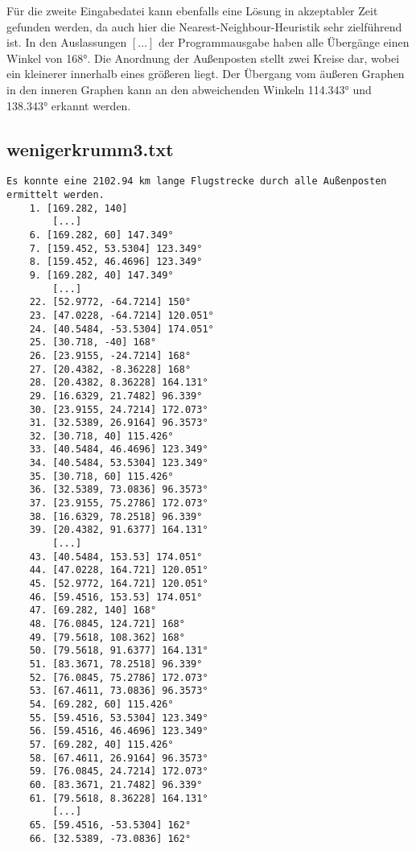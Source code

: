 \documentclass[a4paper,10pt,ngerman]{scrartcl}
\begin{document}
    Für die zweite Eingabedatei kann ebenfalls eine Lösung in akzeptabler Zeit gefunden werden,
    da auch hier die Nearest-Neighbour-Heuristik sehr zielführend ist.
    In den Auslassungen $[\dots]$ der Programmausgabe haben alle Übergänge einen Winkel von 168°.
    Die Anordnung der Außenposten stellt zwei Kreise dar, wobei ein kleinerer innerhalb eines größeren liegt.
    Der Übergang vom äußeren Graphen in den inneren Graphen kann an den abweichenden Winkeln 114.343° und 138.343° erkannt werden.

    \subsection{wenigerkrumm3.txt}\label{subsec:wenigerkrumm3.txt}

    \begin{lstlisting}[frame=single, title=Programmausgabe wenigerkrumm3.txt, breaklines=true,label={lst:lstlisting8}]
    Es konnte eine 2102.94 km lange Flugstrecke durch alle Außenposten ermittelt werden.
    1. [169.282, 140]
        [...]
    6. [169.282, 60] 147.349°
    7. [159.452, 53.5304] 123.349°
    8. [159.452, 46.4696] 123.349°
    9. [169.282, 40] 147.349°
        [...]
    22. [52.9772, -64.7214] 150°
    23. [47.0228, -64.7214] 120.051°
    24. [40.5484, -53.5304] 174.051°
    25. [30.718, -40] 168°
    26. [23.9155, -24.7214] 168°
    27. [20.4382, -8.36228] 168°
    28. [20.4382, 8.36228] 164.131°
    29. [16.6329, 21.7482] 96.339°
    30. [23.9155, 24.7214] 172.073°
    31. [32.5389, 26.9164] 96.3573°
    32. [30.718, 40] 115.426°
    33. [40.5484, 46.4696] 123.349°
    34. [40.5484, 53.5304] 123.349°
    35. [30.718, 60] 115.426°
    36. [32.5389, 73.0836] 96.3573°
    37. [23.9155, 75.2786] 172.073°
    38. [16.6329, 78.2518] 96.339°
    39. [20.4382, 91.6377] 164.131°
        [...]
    43. [40.5484, 153.53] 174.051°
    44. [47.0228, 164.721] 120.051°
    45. [52.9772, 164.721] 120.051°
    46. [59.4516, 153.53] 174.051°
    47. [69.282, 140] 168°
    48. [76.0845, 124.721] 168°
    49. [79.5618, 108.362] 168°
    50. [79.5618, 91.6377] 164.131°
    51. [83.3671, 78.2518] 96.339°
    52. [76.0845, 75.2786] 172.073°
    53. [67.4611, 73.0836] 96.3573°
    54. [69.282, 60] 115.426°
    55. [59.4516, 53.5304] 123.349°
    56. [59.4516, 46.4696] 123.349°
    57. [69.282, 40] 115.426°
    58. [67.4611, 26.9164] 96.3573°
    59. [76.0845, 24.7214] 172.073°
    60. [83.3671, 21.7482] 96.339°
    61. [79.5618, 8.36228] 164.131°
        [...]
    65. [59.4516, -53.5304] 162°
    66. [32.5389, -73.0836] 162°

\end{lstlisting}
\end{document}
